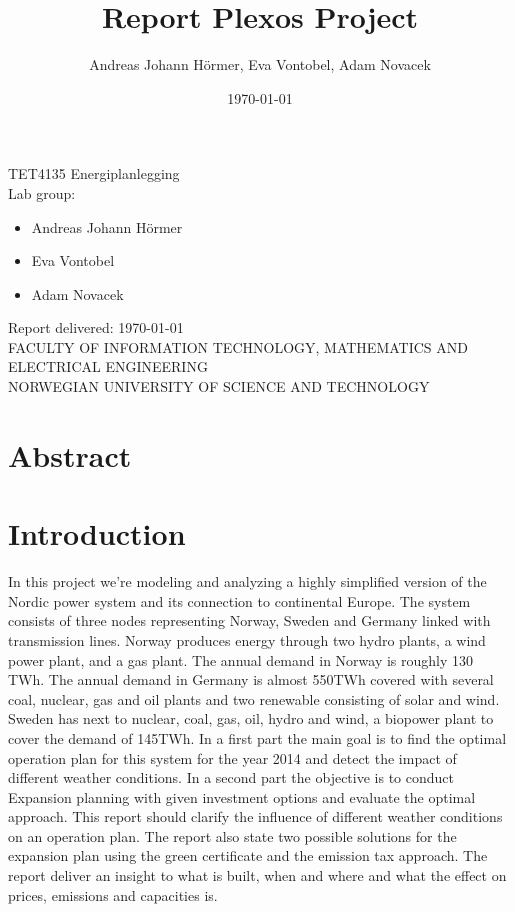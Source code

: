 \documentclass{article}
\title{Report Plexos Project}
\author{Andreas Johann H\"ormer, Eva Vontobel, Adam Novacek}
\date{\today}
\begin{document}
\thispagestyle{empty}
\maketitle
\thispagestyle{empty}
\begin{center}
TET4135 Energiplanlegging\\[3cm]
Lab group:
\begin{itemize}
\item Andreas Johann H\"ormer
\item Eva Vontobel
\item Adam Novacek\\[3cm]
\end{itemize}
Report delivered: \today\\[6cm]
FACULTY OF INFORMATION TECHNOLOGY, MATHEMATICS AND ELECTRICAL ENGINEERING\\
NORWEGIAN UNIVERSITY OF SCIENCE AND TECHNOLOGY
\end{center}
\thispagestyle{empty}
\newpage
\tableofcontents
\thispagestyle{empty}
\newpage
\section*{Abstract}
\thispagestyle{empty}

\newpage
\setcounter{page}{1}
\section{Introduction}
In this project we’re modeling and analyzing a highly simplified version of the Nordic power system and its connection to continental Europe. The system consists of three nodes representing Norway, Sweden and Germany linked with transmission lines. Norway produces energy through two hydro plants, a wind power plant, and a gas plant. The annual demand in Norway is roughly 130 TWh. The annual demand in Germany is almost 550TWh covered with several coal, nuclear, gas and oil plants and two renewable consisting of solar and wind. Sweden has next to nuclear, coal, gas, oil, hydro and wind, a biopower plant to cover the demand of 145TWh. In a first part the main goal is to find the optimal operation plan for this system for the year 2014 and detect the impact of different weather conditions. In a second part the objective is to conduct Expansion planning with given investment options and evaluate the optimal approach. This report should clarify the influence of different weather conditions on an operation plan. The report also state two possible solutions for the expansion plan using the green certificate and the emission tax approach. The report deliver an insight to what is built, when and where and what the effect on prices, emissions and capacities is.
\end{document}
